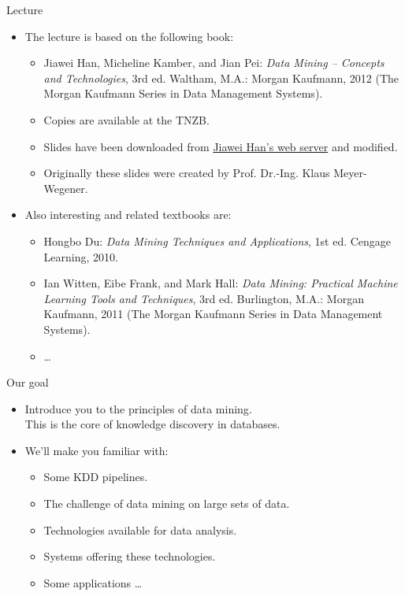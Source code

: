 \documentclass[aspectratio=169,t]{beamer}
\begin{document}
  { %
    \begin{frame}{Lecture}
      \begin{itemize}
          \item The lecture is based on the following book:
              \begin{itemize}
                  \item Jiawei Han, Micheline Kamber, and Jian Pei: \emph{Data Mining – Concepts and Technologies}, 3rd ed. Waltham, M.A.: Morgan Kaufmann, 2012 (The Morgan Kaufmann Series in Data Management Systems).
                  \item \small{Copies are available at the TNZB.}
                  \item \small{Slides have been downloaded from \href{http://hanj.cs.illinois.edu/}{Jiawei Han's web server} and modified.}
                  \item \small{Originally these slides were created by Prof. Dr.-Ing. Klaus Meyer-Wegener.}
              \end{itemize}
          \item Also interesting and related textbooks are:
              \begin{itemize}
                  \item Hongbo Du: \emph{Data Mining Techniques and Applications}, 1st ed. Cengage Learning, 2010.
                  \item Ian Witten, Eibe Frank, and Mark Hall: \emph{Data Mining: Practical Machine Learning Tools and Techniques}, 3rd ed. Burlington, M.A.: Morgan Kaufmann, 2011 (The Morgan Kaufmann Series in Data Management Systems).
                  \item \ldots
              \end{itemize}
      \end{itemize}
    \end{frame}
  }

  { %
    \begin{frame}{Our goal}
      \begin{itemize}
          \item Introduce you to the principles of data mining. \\ This is the core of knowledge discovery in databases.
          \item We'll make you familiar with:
              \begin{itemize}
                  \item Some KDD pipelines.
                  \item The challenge of data mining on large sets of data.
                  \item Technologies available for data analysis.
                  \item Systems offering these technologies.
                  \item Some applications \ldots
              \end{itemize}
      \end{itemize}
    \end{frame}
  }
\end{document}
